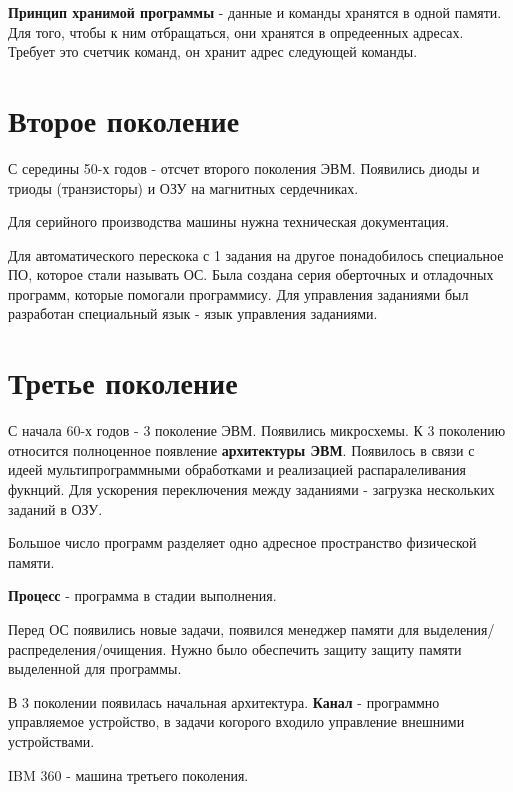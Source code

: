\documentclass[a4paper, 14pt]{report}
\begin{document}
    \textbf{Принцип хранимой программы} - данные и команды хранятся в одной памяти. Для того, чтобы к ним отбращаться, они хранятся в опредеенных адресах. Требует это счетчик команд, он хранит адрес следующей команды.

    \section{Второе поколение}

    С середины 50-х годов - отсчет второго поколения ЭВМ. Появились диоды и триоды (транзисторы) и ОЗУ на магнитных сердечниках.

    Для серийного производства машины нужна техническая документация.


    Для автоматического перескока с 1 задания на другое понадобилось специальное ПО, которое стали называть ОС. Была создана серия оберточных и отладочных программ, которые помогали программису. Для управления заданиями был разработан специальный язык - язык управления заданиями.

    \section{Третье поколение}

    С начала 60-х годов - 3 поколение ЭВМ. Появились микросхемы. К 3 поколению относится полноценное появление \textbf{архитектуры ЭВМ}. Появилось в связи с идеей мультипрограммными обработками и реализацией распаралеливания фукнций. Для ускорения переключения между заданиями - загрузка нескольких заданий в ОЗУ.

    Большое число программ разделяет одно адресное пространство физической памяти.

    \textbf{Процесс} - программа в стадии выполнения.

    Перед ОС появились новые задачи, появился менеджер памяти для выделения/распределения/очищения. Нужно было обеспечить защиту защиту памяти выделенной для программы.

    В 3 поколении появилась начальная архитектура. \textbf{Канал} - программно управляемое устройство, в задачи когорого входило управление внешними устройствами.

    IBM 360 - машина третьего поколения.
\end{document}
